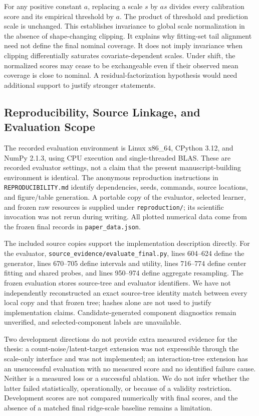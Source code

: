 \documentclass{article}
\begin{document}
For any positive constant $a$, replacing a scale $s$ by $as$ divides every calibration score and its empirical threshold by $a$. The product of threshold and prediction scale is unchanged. This establishes invariance to global scale normalization in the absence of shape-changing clipping. It explains why fitting-set tail alignment need not define the final nominal coverage. It does not imply invariance when clipping differentially saturates covariate-dependent scales. Under shift, the normalized scores may cease to be exchangeable even if their observed mean coverage is close to nominal. A residual-factorization hypothesis would need additional support to justify stronger statements.

\subsection{Reproducibility, Source Linkage, and Evaluation Scope}
The recorded evaluation environment is Linux x86\_64, CPython 3.12, and NumPy 2.1.3, using CPU execution and single-threaded BLAS. These are recorded evaluator settings, not a claim that the present manuscript-building environment is identical. The anonymous reproduction instructions in \texttt{REPRODUCIBILITY.md} identify dependencies, seeds, commands, source locations, and figure/table generation. A portable copy of the evaluator, selected learner, and frozen raw resources is supplied under \texttt{reproduction/}; its scientific invocation was not rerun during writing. All plotted numerical data come from the frozen final records in \texttt{paper\_data.json}.

The included source copies support the implementation description directly. For the evaluator, \texttt{source\_evidence/evaluate\_final.py}, lines 604--624 define the generator, lines 670--705 define intervals and utility, lines 716--774 define center fitting and shared probes, and lines 950--974 define aggregate resampling. The frozen evaluation stores source-tree and evaluator identifiers. We have not independently reconstructed an exact source-tree identity match between every local copy and that frozen tree; hashes alone are not used to justify implementation claims. Candidate-generated component diagnostics remain unverified, and selected-component labels are unavailable.

Two development directions do not provide extra measured evidence for the thesis: a count-noise/latent-target extension was not expressible through the scale-only interface and was not implemented; an interaction-tree extension has an unsuccessful evaluation with no measured score and no identified failure cause. Neither is a measured loss or a successful ablation. We do not infer whether the latter failed statistically, operationally, or because of a validity restriction. Development scores are not compared numerically with final scores, and the absence of a matched final ridge-scale baseline remains a limitation.
\end{document}
